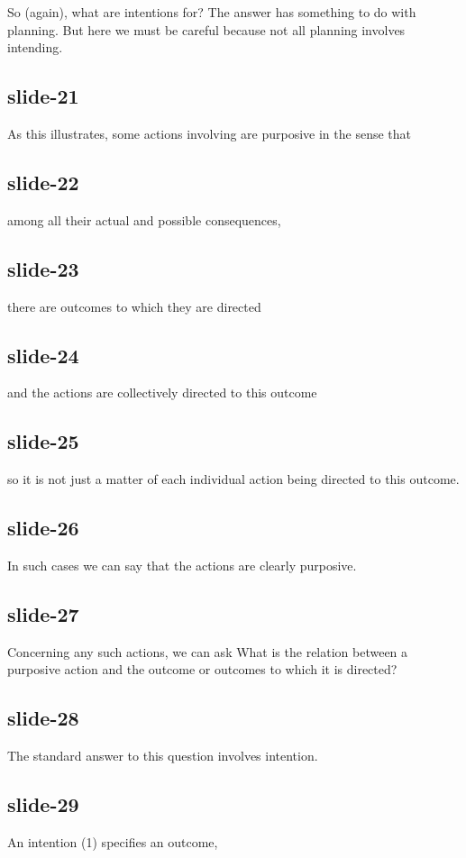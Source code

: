 \documentclass[12pt,\papersize]{extarticle}
\begin{document}
So (again), what are intentions for?
The answer has something to do with planning.
But here we must be careful because not all planning involves intending.

\subsection{slide-21}
As this illustrates,
some actions involving are purposive in the sense that

\subsection{slide-22}
among all their actual and possible consequences,

\subsection{slide-23}
there are outcomes to which they are directed

\subsection{slide-24}
and the actions are collectively directed to this outcome

\subsection{slide-25}
so it is not just a matter of each individual action being directed to this outcome.

\subsection{slide-26}
In such cases we can say that the actions are clearly purposive.

\subsection{slide-27}
Concerning any such actions, we can ask
What is the relation between a purposive action and the outcome or outcomes to which it is directed?

\subsection{slide-28}
The standard answer to this question involves intention.

\subsection{slide-29}
An intention (1) specifies an outcome,
\end{document}
